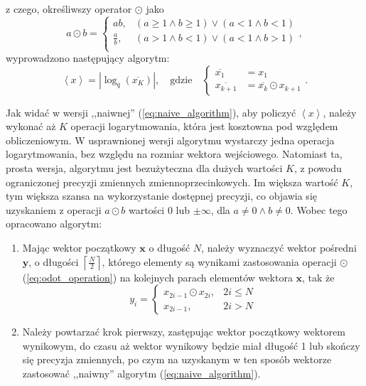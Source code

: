 \documentclass[pl,12pt]{aghdpl}
\begin{document}
z czego, określiwszy operator $\odot$ jako
\begin{equation}\label{eq:odot_operation}
  a \odot b = \begin{cases}
    ab, & (a \geq 1 \land b \geq 1) \lor (a < 1 \land b < 1)\\
    \frac{a}{b}, & (a > 1 \land b < 1) \lor (a < 1 \land b > 1)\\
  \end{cases},
\end{equation}
wyprowadzono następujący algorytm:
\begin{equation}
  \left<x\right> = |\log_q(\overline{x_K})|, \quad\text{gdzie}\quad
  \begin{cases}
    \overline{x_1} &= x_1\\
    \overline{x_{k+1}} &= \overline{x_k}\odot x_{k+1}
  \end{cases}.
\end{equation}

Jak widać w wersji ,,naiwnej'' (\ref{eq:naive_algorithm}), aby policzyć
$\left<x\right>$, należy wykonać aż $K$ operacji logarytmowania, która jest
kosztowna pod względem obliczeniowym. W usprawnionej wersji algorytmu wystarczy
jedna operacja logarytmowania, bez względu na rozmiar wektora wejściowego.
Natomiast ta, prosta wersja, algorytmu jest bezużyteczna dla dużych wartości $K$,
z powodu ograniczonej precyzji zmiennych zmiennoprzecinkowych. Im większa
wartość $K$, tym większa szansa na wykorzystanie dostępnej precyzji, co objawia
się uzyskaniem z operacji $a \odot b$ wartości $0$ lub $\pm\infty$, dla
$a \neq 0 \land b \neq 0$. Wobec tego opracowano algorytm:
\begin{enumerate}
  \item Mając wektor początkowy $\bm x$ o długość $N$, należy wyznaczyć wektor
    pośredni $\bm y$, o długości
    $\left\lceil\frac{N}{2}\right\rceil$, którego elementy są wynikami
    zastosowania operacji $\odot$ (\ref{eq:odot_operation}) na kolejnych parach
    elementów wektora $\bm x$, tak że \begin{equation}
      y_i = \begin{cases}
        x_{2i-1}\odot x_{2i}, & 2i \leq N\\
        x_{2i-1}, & 2i > N
      \end{cases}
    \end{equation}
  \item Należy powtarzać krok pierwszy, zastępując wektor początkowy wektorem
    wynikowym, do czasu aż wektor wynikowy będzie miał długość 1 lub skończy
    się precyzja zmiennych, po czym na uzyskanym w ten sposób wektorze
    zastosować ,,naiwny'' algorytm (\ref{eq:naive_algorithm}).
\end{enumerate}
\end{document}
